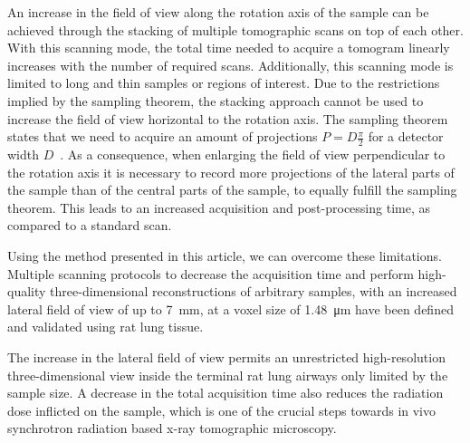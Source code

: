 An increase in the field of view along the rotation axis of the sample can be achieved through the stacking of multiple tomographic scans on top of each other. With this scanning mode, the total time needed to acquire a tomogram linearly increases with the number of required scans. Additionally, this scanning mode is limited to long and thin samples or regions of interest. Due to the restrictions implied by the sampling theorem, the stacking approach cannot be used to increase the field of view horizontal to the rotation axis. The sampling theorem states that we need to acquire an amount of projections $P=D\frac{\pi}{2}$ for a detector width $D$~\cite[page 186]{Kak2002}. As a consequence, when enlarging the field of view perpendicular to the rotation axis it is necessary to record more projections of the lateral parts of the sample than of the central parts of the sample, to equally fulfill the sampling theorem. This leads to an increased acquisition and post-processing time, as compared to a standard scan.

Using the method presented in this article, we can overcome these limitations. Multiple scanning protocols to decrease the acquisition time and perform high-quality three-dimensional reconstructions of arbitrary samples, with an increased lateral field of view of up to \SI{7}{\milli\meter}, at a voxel size of \SI{1.48}{\micro\meter} have been defined and validated using rat lung tissue.

The increase in the lateral field of view permits an unrestricted high-resolution three-dimensional view inside the terminal rat lung airways only limited by the sample size. A decrease in the total acquisition time also reduces the radiation dose inflicted on the sample, which is one of the crucial steps towards in vivo synchrotron radiation based x-ray tomographic microscopy.